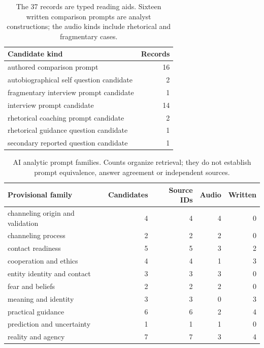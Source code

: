 \begin{table}[t]
\centering\small
\begin{tabular}{p{}r}
\toprule
Candidate kind & Records\\
\midrule
authored comparison prompt & 16\\
autobiographical self question candidate & 2\\
fragmentary interview prompt candidate & 1\\
interview prompt candidate & 14\\
rhetorical coaching prompt candidate & 2\\
rhetorical guidance question candidate & 1\\
secondary reported question candidate & 1\\
\bottomrule
\end{tabular}
\caption{The 37 records are typed reading aids. Sixteen written comparison prompts are analyst constructions; the audio kinds include rhetorical and fragmentary cases.}
\end{table}
\begin{table}[t]
\centering\small
\begin{tabular}{p{}rrrr}
\toprule
Provisional family & Candidates & Source IDs & Audio & Written\\
\midrule
channeling origin and validation & 4 & 4 & 4 & 0\\
channeling process & 2 & 2 & 2 & 0\\
contact readiness & 5 & 5 & 3 & 2\\
cooperation and ethics & 4 & 4 & 1 & 3\\
entity identity and contact & 3 & 3 & 3 & 0\\
fear and beliefs & 2 & 2 & 2 & 0\\
meaning and identity & 3 & 3 & 0 & 3\\
practical guidance & 6 & 6 & 2 & 4\\
prediction and uncertainty & 1 & 1 & 1 & 0\\
reality and agency & 7 & 7 & 3 & 4\\
\bottomrule
\end{tabular}
\caption{AI analytic prompt families. Counts organize retrieval; they do not establish prompt equivalence, answer agreement or independent sources.}
\end{table}
